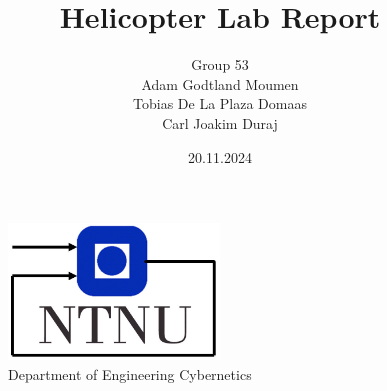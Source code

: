 \documentclass[11pt, a4paper, USenglish]{article} %
\begin{document}
\title{Helicopter Lab Report }
\author{Group 53\\Adam Godtland Moumen\\Tobias De La Plaza Domaas\\Carl Joakim Duraj}
\date{20.11.2024}
\begin{titlepage}
    \maketitle
    \begin{figure}
    \centering
    \includegraphics[width=0.5\textwidth]{figures/itk_ntnu}\\
    Department of Engineering Cybernetics
    \end{figure}
    \thispagestyle{empty}
\end{titlepage}

\newpage
    
\thispagestyle{empty} %

\newpage
\tableofcontents
\thispagestyle{empty} %

\newpage
\setcounter{page}{1}






\newpage
{}
\printbibliography{}
\label{sec:bibliography}
\end{document}

